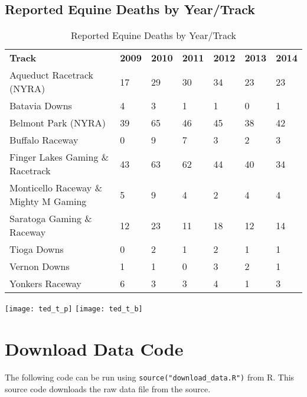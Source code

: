 \documentclass[oneside]{article}
\begin{document}
\subsection{Reported Equine Deaths by Year/Track}
\begin{table}[h]
\centering
\caption{Reported Equine Deaths by Year/Track}
\label{my-label}
\begin{tabular}{|lllllll|}
\hline
{\bf Track}                           & {\bf 2009} & {\bf 2010} & {\bf 2011} & {\bf 2012} & {\bf 2013} & {\bf 2014} \\
Aqueduct Racetrack (NYRA)             & 17         & 29         & 30         & 34         & 23         & 23         \\
Batavia Downs                         & 4          & 3          & 1          & 1          & 0          & 1          \\
Belmont Park (NYRA)                   & 39         & 65         & 46         & 45         & 38         & 42         \\
Buffalo Raceway                       & 0          & 9          & 7          & 3          & 2          & 3          \\
Finger Lakes Gaming \& Racetrack      & 43         & 63         & 62         & 44         & 40         & 34         \\
Monticello Raceway \& Mighty M Gaming & 5          & 9          & 4          & 2          & 4          & 4          \\
Saratoga Gaming \& Raceway            & 12         & 23         & 11         & 18         & 12         & 14         \\
Tioga Downs                           & 0          & 2          & 1          & 2          & 1          & 1          \\
Vernon Downs                          & 1          & 1          & 0          & 3          & 2          & 1          \\
Yonkers Raceway                       & 6          & 3          & 3          & 4          & 1          & 3          \\ \hline
\end{tabular}
\end{table}
\texttt{[image: ted\_t\_p]}
\texttt{[image: ted\_t\_b]}

\newpage
\appendix
\section{Download Data Code}
The following code can be run using \verb|source("download_data.R")| from R. This source code downloads the raw data file from the source.
\end{document}

